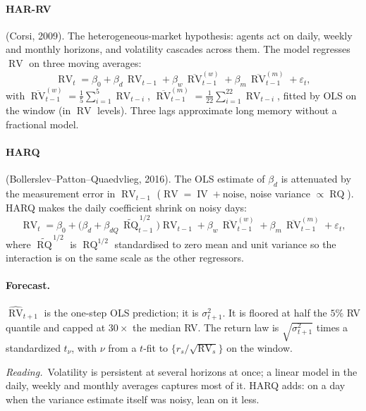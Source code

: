 \documentclass[11pt,a4paper]{article}
\newcommand{\RV}{\operatorname{RV}}
\newcommand{\RQ}{\operatorname{RQ}}
\newcommand{\IV}{\operatorname{IV}}
\newcommand{\intuition}[1]{\par\smallskip\noindent\textit{Reading.}\ #1\par\smallskip}
\begin{document}
\paragraph{HAR-RV} (Corsi, 2009). The heterogeneous-market hypothesis: agents
act on daily, weekly and monthly horizons, and volatility cascades across them.
The model regresses $\RV$ on three moving averages:
\begin{equation}
  \RV_t = \beta_0
        + \beta_d\,\RV_{t-1}
        + \beta_w\,\overline{\RV}^{(w)}_{t-1}
        + \beta_m\,\overline{\RV}^{(m)}_{t-1}
        + \varepsilon_t,
\end{equation}
with $\overline{\RV}^{(w)}_{t-1}=\tfrac15\sum_{i=1}^{5}\RV_{t-i}$,
$\overline{\RV}^{(m)}_{t-1}=\tfrac1{22}\sum_{i=1}^{22}\RV_{t-i}$, fitted by OLS
on the window (in $\RV$ levels). Three lags approximate long memory without a
fractional model.

\paragraph{HARQ} (Bollerslev--Patton--Quaedvlieg, 2016). The OLS estimate of
$\beta_d$ is attenuated by the measurement error in $\RV_{t-1}$
($\RV = \IV + \text{noise}$, noise variance $\propto \RQ$). HARQ makes the daily
coefficient shrink on noisy days:
\begin{equation}
  \RV_t = \beta_0
        + \big(\beta_d + \beta_{dQ}\,\widetilde{\RQ}^{\,1/2}_{t-1}\big)\RV_{t-1}
        + \beta_w\,\overline{\RV}^{(w)}_{t-1}
        + \beta_m\,\overline{\RV}^{(m)}_{t-1}
        + \varepsilon_t,
\end{equation}
where $\widetilde{\RQ}^{\,1/2}$ is $\RQ^{1/2}$ standardised to zero mean and unit
variance so the interaction is on the same scale as the other regressors.

\paragraph{Forecast.} $\widehat{\RV}_{t+1}$ is the one-step OLS prediction; it is
$\sigma_{t+1}^2$. It is floored at half the $5\%$ RV quantile and capped at
$30\times$ the median RV. The return law is $\sqrt{\sigma_{t+1}^2}$ times a
standardized $t_\nu$, with $\nu$ from a $t$-fit to $\{r_s/\sqrt{\RV_s}\}$ on the
window.

\intuition{Volatility is persistent at several horizons at once; a linear model
in the daily, weekly and monthly averages captures most of it. HARQ adds: on a
day when the variance estimate itself was noisy, lean on it less.}
\end{document}
